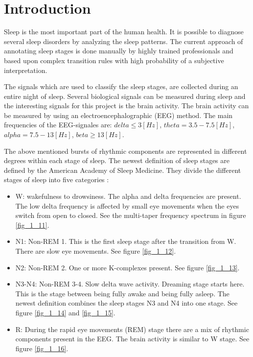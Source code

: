 \section{Introduction}
\label{sec:intro}

Sleep is the most important part of the human health. It is possible to diagnose several sleep disorders by analyzing the sleep patterns.
The current approach of annotating sleep stages is done manually by highly trained professionals and based upon complex transition rules with high probability of a subjective interpretation.

The signals which are used to classify the sleep stages, are collected during an entire night of sleep. Several biological signals can be measured during sleep and the interesting signals for this project is the brain activity. The brain activity can be measured by using an electroencephalographic (EEG) method. 
The main frequencies of the EEG-signales are: $delta \le 3 \left[ Hz \right]$, 
$theta= 3.5-7.5 \left[ Hz \right]$,
$alpha= 7.5-13 \left[ Hz \right]$, 
$beta \ge 13 \left[ Hz \right]$.

The above mentioned bursts of rhythmic components are represented in different degrees within each stage of sleep.   
The newest definition of sleep stages are defined by the American Academy of Sleep Medicine. They divide the different stages of sleep into five categories \cite{main_ar, AASM}: 
\begin{itemize}
\item W: wakefulness to drowsiness. The alpha and delta frequencies are present. The low delta frequency is affected by small eye movements when the eyes switch from open to closed. See the multi-taper frequency spectrum in figure \ref{fig_1_11}.
\item N1: Non-REM 1. This is the first sleep stage after the transition from W. There are slow eye movements. See figure \ref{fig_1_12}.
\item N2: Non-REM 2. One or more K-complexes present. See figure \ref{fig_1_13}.
\item N3-N4: Non-REM 3-4. Slow delta wave activity. Dreaming stage starts here. This is the stage between being fully awake and being fully asleep. The newest definition combines the sleep stages N3 and N4 into one stage. See figure \ref{fig_1_14} and \ref{fig_1_15}.
\item R: During the rapid eye movements (REM) stage there are a mix of rhythmic components present in the EEG. The brain activity is similar to W stage. See figure \ref{fig_1_16}.
\end{itemize} 

